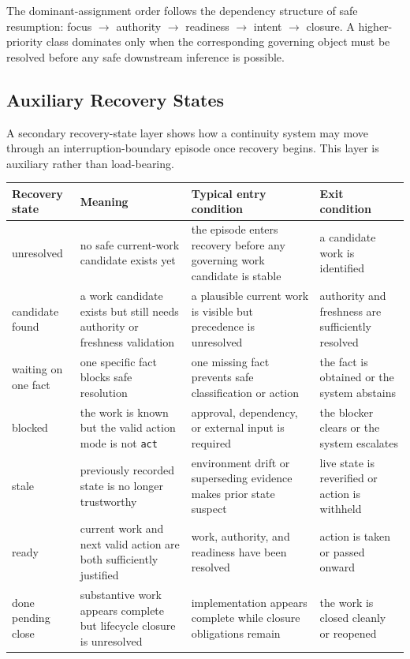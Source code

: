 \documentclass[a4paper,fleqn]{cas-dc}
\begin{document}
The dominant-assignment order follows the dependency structure of safe resumption: focus $\rightarrow$ authority $\rightarrow$ readiness $\rightarrow$ intent $\rightarrow$ closure. A higher-priority class dominates only when the corresponding governing object must be resolved before any safe downstream inference is possible.

\subsection{Auxiliary Recovery States}

A secondary recovery-state layer shows how a continuity system may move through an interruption-boundary episode once recovery begins. This layer is auxiliary rather than load-bearing.

\begin{strip}
\captionsetup{type=table}
\label{tab:recovery-states}
\centering
\footnotesize
\setlength{\tabcolsep}{4pt}
\renewcommand{\arraystretch}{1.05}
\begin{tabularx}{\textwidth}{>{\raggedright\arraybackslash}p{} >{\raggedright\arraybackslash}p{} >{\raggedright\arraybackslash}p{} X}
\toprule
Recovery state & Meaning & Typical entry condition & Exit condition \\
\midrule
unresolved & no safe current-work candidate exists yet & the episode enters recovery before any governing work candidate is stable & a candidate work is identified \\
candidate found & a work candidate exists but still needs authority or freshness validation & a plausible current work is visible but precedence is unresolved & authority and freshness are sufficiently resolved \\
waiting on one fact & one specific fact blocks safe resolution & one missing fact prevents safe classification or action & the fact is obtained or the system abstains \\
blocked & the work is known but the valid action mode is not \texttt{act} & approval, dependency, or external input is required & the blocker clears or the system escalates \\
stale & previously recorded state is no longer trustworthy & environment drift or superseding evidence makes prior state suspect & live state is reverified or action is withheld \\
ready & current work and next valid action are both sufficiently justified & work, authority, and readiness have been resolved & action is taken or passed onward \\
done pending close & substantive work appears complete but lifecycle closure is unresolved & implementation appears complete while closure obligations remain & the work is closed cleanly or reopened \\
\bottomrule
\end{tabularx}
\end{strip}
\end{document}
